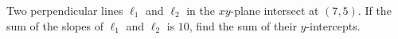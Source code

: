 Two perpendicular lines \(\ell_1\) and \(\ell_2\) in the \(xy\)-plane intersect at \((7,5)\). If the sum of the slopes of \(\ell_1\) and \(\ell_2\) is \(10\), find the sum of their \(y\)-intercepts.
